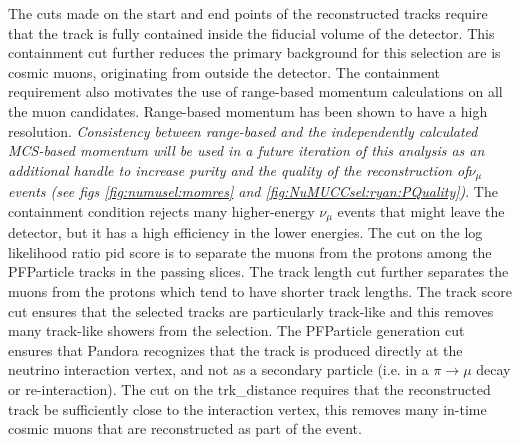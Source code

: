 \par \noindent The cuts made on the start and end points of the reconstructed tracks require that the track is fully contained inside the fiducial volume of the detector. This containment cut further reduces the primary background for this selection are is cosmic muons, originating from outside the detector. The containment requirement also motivates the use of range-based momentum calculations on all the muon candidates. Range-based momentum has been shown to have a high resolution. \emph{Consistency between range-based and the independently calculated MCS-based momentum will be used in a future iteration of this analysis as an additional handle to increase purity and the quality of the reconstruction of$\nu_{\mu}$ events (see figs \ref{fig:numusel:momres} and \ref{fig:NuMUCCsel:ryan:PQuality})}. The containment condition rejects many higher-energy $\nu_{\mu}$ events that might leave the detector, but it has a high efficiency in the lower energies.
The cut on the log likelihood ratio pid score is to separate the muons from the protons among the PFParticle tracks in the passing slices. The track length cut further separates the muons from the protons which tend to have shorter track lengths. 
The track score cut ensures that the selected tracks are particularly track-like and this removes many track-like showers from the selection.  The PFParticle generation cut ensures that Pandora recognizes that the track is produced directly at the neutrino interaction vertex, and not as a secondary particle (i.e. in a $\pi \rightarrow \mu$ decay or re-interaction). 
The cut on the trk\_distance requires that the reconstructed track be sufficiently close to the interaction vertex, this removes many in-time cosmic muons that are reconstructed as part of the event.


